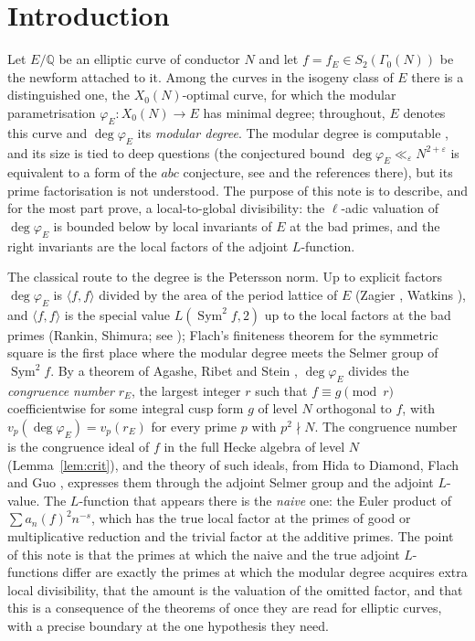 \documentclass[11pt]{amsart}
\theoremstyle{definition}
\newcommand{\Q}{\mathbb{Q}}
\newcommand{\degphi}{\deg\varphi_E}
\newcommand{\Sym}{\operatorname{Sym}^2}
\begin{document}
\maketitle

\section{Introduction}

Let $E/\Q$ be an elliptic curve of conductor $N$ and let $f=f_E\in S_2(\Gamma_0(N))$ be the newform attached to it. Among the curves in the isogeny class of $E$ there is a distinguished one, the $X_0(N)$-optimal curve, for which the modular parametrisation $\varphi_E\colon X_0(N)\to E$ has minimal degree; throughout, $E$ denotes this curve and $\degphi$ its \emph{modular degree}. The modular degree is computable \cite{Cremona97,Watkins02}, and its size is tied to deep questions (the conjectured bound $\degphi\ll_\varepsilon N^{2+\varepsilon}$ is equivalent to a form of the $abc$ conjecture, see \cite[\S2]{ARS12} and the references there), but its prime factorisation is not understood. The purpose of this note is to describe, and for the most part prove, a local-to-global divisibility: the $\ell$-adic valuation of $\degphi$ is bounded below by local invariants of $E$ at the bad primes, and the right invariants are the local factors of the adjoint $L$-function.

The classical route to the degree is the Petersson norm. Up to explicit factors $\degphi$ is $\langle f,f\rangle$ divided by the area of the period lattice of $E$ (Zagier \cite{Zagier85}, Watkins \cite{Watkins02}), and $\langle f,f\rangle$ is the special value $L(\Sym f,2)$ up to the local factors at the bad primes (Rankin, Shimura; see \cite[Lemma 2.12]{DFG04}); Flach's finiteness theorem for the symmetric square \cite{Flach92} is the first place where the modular degree meets the Selmer group of $\Sym f$. By a theorem of Agashe, Ribet and Stein \cite[Theorem 2.2]{ARS12}, $\degphi$ divides the \emph{congruence number} $r_E$, the largest integer $r$ such that $f\equiv g\pmod r$ coefficientwise for some integral cusp form $g$ of level $N$ orthogonal to $f$, with $v_p(\degphi)=v_p(r_E)$ for every prime $p$ with $p^2\nmid N$. The congruence number is the congruence ideal of $f$ in the full Hecke algebra of level $N$ (Lemma~\ref{lem:crit}), and the theory of such ideals, from Hida \cite{Hida81} to Diamond, Flach and Guo \cite{DFG04}, expresses them through the adjoint Selmer group and the adjoint $L$-value. The $L$-function that appears there is the \emph{naive} one: the Euler product of $\sum a_n(f)^2n^{-s}$, which has the true local factor at the primes of good or multiplicative reduction and the trivial factor at the additive primes. The point of this note is that the primes at which the naive and the true adjoint $L$-functions differ are exactly the primes at which the modular degree acquires extra local divisibility, that the amount is the valuation of the omitted factor, and that this is a consequence of the theorems of \cite{DFG04} once they are read for elliptic curves, with a precise boundary at the one hypothesis they need.
\end{document}
